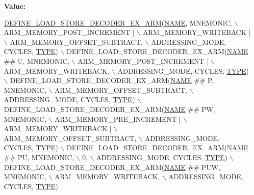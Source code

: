 {\bfseries Value\+:}
\begin{DoxyCode}
\mbox{\hyperlink{decoder-arm_8c_a5d6d802380fe63152e39d49de3ceb848}{DEFINE\_LOAD\_STORE\_DECODER\_EX\_ARM}}(\mbox{\hyperlink{inflate_8h_a164ea0159d5f0b5f12a646f25f99eceaa67bc2ced260a8e43805d2480a785d312}{NAME}}, MNEMONIC, \(\backslash\)
        ARM\_MEMORY\_POST\_INCREMENT | \(\backslash\)
        ARM\_MEMORY\_WRITEBACK | \(\backslash\)
        ARM\_MEMORY\_OFFSET\_SUBTRACT, \(\backslash\)
        ADDRESSING\_MODE, CYCLES, \mbox{\hyperlink{inflate9_8h_a164ea0159d5f0b5f12a646f25f99eceaab47ea8bb955afd0adc0ef98517dd6084}{TYPE}}) \(\backslash\)
    DEFINE\_LOAD\_STORE\_DECODER\_EX\_ARM(\mbox{\hyperlink{inflate_8h_a164ea0159d5f0b5f12a646f25f99eceaa67bc2ced260a8e43805d2480a785d312}{NAME}} ## U, MNEMONIC, \(\backslash\)
        ARM\_MEMORY\_POST\_INCREMENT | \(\backslash\)
        ARM\_MEMORY\_WRITEBACK, \(\backslash\)
        ADDRESSING\_MODE, CYCLES, \mbox{\hyperlink{inflate9_8h_a164ea0159d5f0b5f12a646f25f99eceaab47ea8bb955afd0adc0ef98517dd6084}{TYPE}}) \(\backslash\)
    DEFINE\_LOAD\_STORE\_DECODER\_EX\_ARM(\mbox{\hyperlink{inflate_8h_a164ea0159d5f0b5f12a646f25f99eceaa67bc2ced260a8e43805d2480a785d312}{NAME}} ## P, MNEMONIC, \(\backslash\)
        ARM\_MEMORY\_OFFSET\_SUBTRACT, \(\backslash\)
        ADDRESSING\_MODE, CYCLES, \mbox{\hyperlink{inflate9_8h_a164ea0159d5f0b5f12a646f25f99eceaab47ea8bb955afd0adc0ef98517dd6084}{TYPE}}) \(\backslash\)
    DEFINE\_LOAD\_STORE\_DECODER\_EX\_ARM(\mbox{\hyperlink{inflate_8h_a164ea0159d5f0b5f12a646f25f99eceaa67bc2ced260a8e43805d2480a785d312}{NAME}} ## PW, MNEMONIC, \(\backslash\)
        ARM\_MEMORY\_PRE\_INCREMENT | \(\backslash\)
        ARM\_MEMORY\_WRITEBACK | \(\backslash\)
        ARM\_MEMORY\_OFFSET\_SUBTRACT, \(\backslash\)
        ADDRESSING\_MODE, CYCLES, \mbox{\hyperlink{inflate9_8h_a164ea0159d5f0b5f12a646f25f99eceaab47ea8bb955afd0adc0ef98517dd6084}{TYPE}}) \(\backslash\)
    DEFINE\_LOAD\_STORE\_DECODER\_EX\_ARM(\mbox{\hyperlink{inflate_8h_a164ea0159d5f0b5f12a646f25f99eceaa67bc2ced260a8e43805d2480a785d312}{NAME}} ## PU, MNEMONIC, \(\backslash\)
        0, \(\backslash\)
        ADDRESSING\_MODE, CYCLES, \mbox{\hyperlink{inflate9_8h_a164ea0159d5f0b5f12a646f25f99eceaab47ea8bb955afd0adc0ef98517dd6084}{TYPE}}) \(\backslash\)
    DEFINE\_LOAD\_STORE\_DECODER\_EX\_ARM(\mbox{\hyperlink{inflate_8h_a164ea0159d5f0b5f12a646f25f99eceaa67bc2ced260a8e43805d2480a785d312}{NAME}} ## PUW, MNEMONIC, \(\backslash\)
        ARM\_MEMORY\_WRITEBACK, \(\backslash\)
        ADDRESSING\_MODE, CYCLES, \mbox{\hyperlink{inflate9_8h_a164ea0159d5f0b5f12a646f25f99eceaab47ea8bb955afd0adc0ef98517dd6084}{TYPE}})
\end{DoxyCode}
